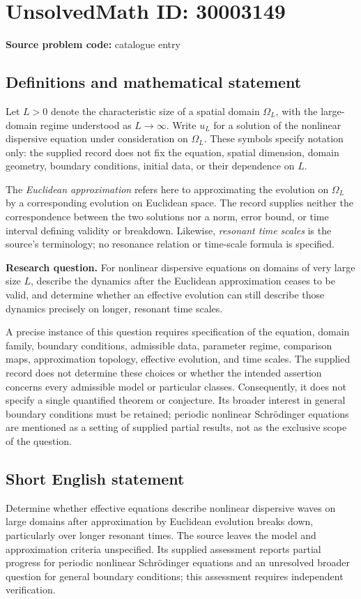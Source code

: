 \documentclass[11pt]{article}
\begin{document}
\section*{UnsolvedMath ID: 30003149}
\textbf{Source problem code:} catalogue entry
\subsection{Definitions and mathematical statement}
Let \(L>0\) denote the characteristic size of a spatial domain \(\Omega_L\), with the large-domain regime understood as \(L\to\infty\). Write \(u_L\) for a solution of the nonlinear dispersive equation under consideration on \(\Omega_L\). These symbols specify notation only: the supplied record does not fix the equation, spatial dimension, domain geometry, boundary conditions, initial data, or their dependence on \(L\).

The \emph{Euclidean approximation} refers here to approximating the evolution on \(\Omega_L\) by a corresponding evolution on Euclidean space. The record supplies neither the correspondence between the two solutions nor a norm, error bound, or time interval defining validity or breakdown. Likewise, \emph{resonant time scales} is the source's terminology; no resonance relation or time-scale formula is specified.

\textbf{Research question.} For nonlinear dispersive equations on domains of very large size \(L\), describe the dynamics after the Euclidean approximation ceases to be valid, and determine whether an effective evolution can still describe those dynamics precisely on longer, resonant time scales.

A precise instance of this question requires specification of the equation, domain family, boundary conditions, admissible data, parameter regime, comparison maps, approximation topology, effective evolution, and time scales. The supplied record does not determine these choices or whether the intended assertion concerns every admissible model or particular classes. Consequently, it does not specify a single quantified theorem or conjecture. Its broader interest in general boundary conditions must be retained; periodic nonlinear Schr\"odinger equations are mentioned as a setting of supplied partial results, not as the exclusive scope of the question.
\subsection{Short English statement}
Determine whether effective equations describe nonlinear dispersive waves on large domains after approximation by Euclidean evolution breaks down, particularly over longer resonant times. The source leaves the model and approximation criteria unspecified. Its supplied assessment reports partial progress for periodic nonlinear Schr\"odinger equations and an unresolved broader question for general boundary conditions; this assessment requires independent verification.
\end{document}
